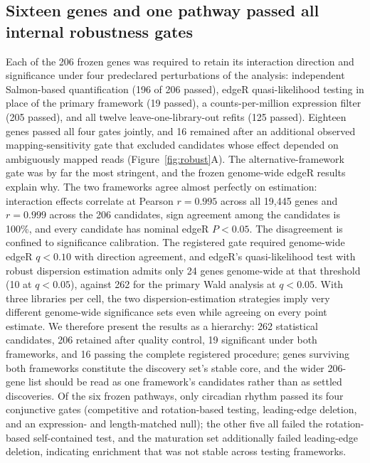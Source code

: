 \documentclass[11pt]{article}
\newcommand{\q}{\textit{q}}
\begin{document}
\subsection{Sixteen genes and one pathway passed all internal robustness gates}

Each of the 206 frozen genes was required to retain its interaction direction and significance under four predeclared perturbations of the analysis: independent Salmon-based quantification (196 of 206 passed), edgeR quasi-likelihood testing in place of the primary framework (19 passed), a counts-per-million expression filter (205 passed), and all twelve leave-one-library-out refits (125 passed). Eighteen genes passed all four gates jointly, and 16 remained after an additional observed mapping-sensitivity gate that excluded candidates whose effect depended on ambiguously mapped reads (Figure~\ref{fig:robust}A). The alternative-framework gate was by far the most stringent, and the frozen genome-wide edgeR results explain why. The two frameworks agree almost perfectly on estimation: interaction effects correlate at Pearson $r=0.995$ across all 19,445 genes and $r=0.999$ across the 206 candidates, sign agreement among the candidates is 100\%, and every candidate has nominal edgeR $P<0.05$. The disagreement is confined to significance calibration. The registered gate required genome-wide edgeR $\q<0.10$ with direction agreement, and edgeR's quasi-likelihood test with robust dispersion estimation admits only 24 genes genome-wide at that threshold (10 at $\q<0.05$), against 262 for the primary Wald analysis at $\q<0.05$. With three libraries per cell, the two dispersion-estimation strategies imply very different genome-wide significance sets even while agreeing on every point estimate. We therefore present the results as a hierarchy: 262 statistical candidates, 206 retained after quality control, 19 significant under both frameworks, and 16 passing the complete registered procedure; genes surviving both frameworks constitute the discovery set's stable core, and the wider 206-gene list should be read as one framework's candidates rather than as settled discoveries. Of the six frozen pathways, only circadian rhythm passed its four conjunctive gates (competitive and rotation-based testing, leading-edge deletion, and an expression- and length-matched null); the other five all failed the rotation-based self-contained test, and the maturation set additionally failed leading-edge deletion, indicating enrichment that was not stable across testing frameworks.
\end{document}
